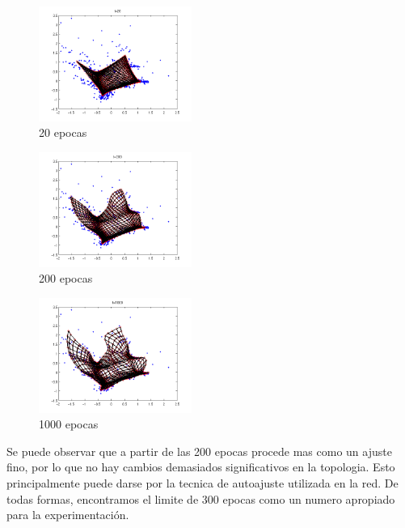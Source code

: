 \documentclass[informe.tex]{subfiles}
\begin{document}
	\begin{minipage}{0.30\textwidth}
	  \centering
	  \begin{figure}[H]
	    \centering
	    \includegraphics[height=3.75cm,keepaspectratio]{graficos/tiempo/20.png}
		  \caption{\small 20 epocas}
	  \end{figure}
	  
	  \begin{figure}[H]
	    \centering
	    \includegraphics[height=3.75cm,keepaspectratio]{graficos/tiempo/200.png}
		  \caption{\small 200 epocas}
	  \end{figure}
	  
	  \begin{figure}[H]
	    \centering
	    \includegraphics[height=3.75cm,keepaspectratio]{graficos/tiempo/1000.png}
		  \caption{\small 1000 epocas}
	  \end{figure}
	\end{minipage}
       
       \newpage
       
       Se puede observar que a partir de las 200 epocas procede mas como un ajuste fino, por lo que no hay cambios demasiados significativos en la topologia. Esto principalmente puede darse por la tecnica de autoajuste utilizada en la red. De todas formas, encontramos el limite de 300 epocas como un numero apropiado para la experimentaci\'on.
       
\end{document}
